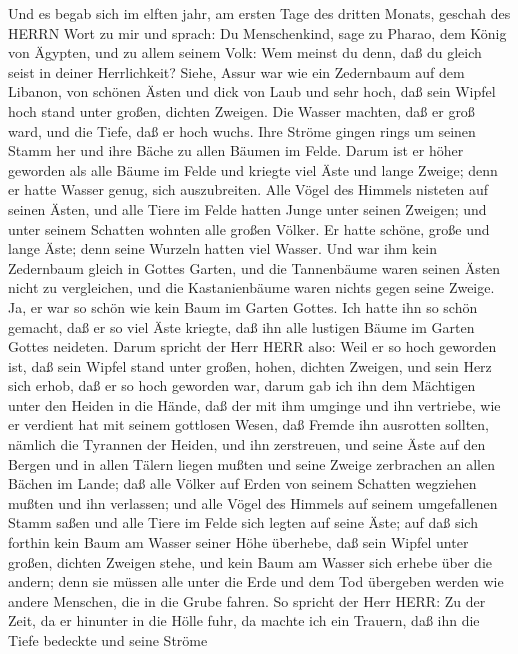  Und es begab sich im elften jahr, am ersten Tage des
dritten Monats, geschah des HERRN Wort zu mir und sprach: 
Du Menschenkind, sage zu Pharao, dem König von Ägypten, und zu allem
seinem Volk: Wem meinst du denn, daß du gleich seist in deiner
Herrlichkeit?  Siehe, Assur war wie ein Zedernbaum auf dem
Libanon, von schönen Ästen und dick von Laub und sehr hoch, daß sein
Wipfel hoch stand unter großen, dichten Zweigen.  Die Wasser
machten, daß er groß ward, und die Tiefe, daß er hoch wuchs. Ihre Ströme
gingen rings um seinen Stamm her und ihre Bäche zu allen Bäumen im
Felde.  Darum ist er höher geworden als alle Bäume im Felde
und kriegte viel Äste und lange Zweige; denn er hatte Wasser genug, sich
auszubreiten.  Alle Vögel des Himmels nisteten auf seinen
Ästen, und alle Tiere im Felde hatten Junge unter seinen Zweigen; und
unter seinem Schatten wohnten alle großen Völker.  Er hatte
schöne, große und lange Äste; denn seine Wurzeln hatten viel Wasser.
 Und war ihm kein Zedernbaum gleich in Gottes Garten, und
die Tannenbäume waren seinen Ästen nicht zu vergleichen, und die
Kastanienbäume waren nichts gegen seine Zweige. Ja, er war so schön wie
kein Baum im Garten Gottes.  Ich hatte ihn so schön gemacht,
daß er so viel Äste kriegte, daß ihn alle lustigen Bäume im Garten
Gottes neideten.  Darum spricht der Herr HERR also: Weil er
so hoch geworden ist, daß sein Wipfel stand unter großen, hohen, dichten
Zweigen, und sein Herz sich erhob, daß er so hoch geworden war,
 darum gab ich ihn dem Mächtigen unter den Heiden in die
Hände, daß der mit ihm umginge und ihn vertriebe, wie er verdient hat
mit seinem gottlosen Wesen,  daß Fremde ihn ausrotten
sollten, nämlich die Tyrannen der Heiden, und ihn zerstreuen, und seine
Äste auf den Bergen und in allen Tälern liegen mußten und seine Zweige
zerbrachen an allen Bächen im Lande; daß alle Völker auf Erden von
seinem Schatten wegziehen mußten und ihn verlassen;  und
alle Vögel des Himmels auf seinem umgefallenen Stamm saßen und alle
Tiere im Felde sich legten auf seine Äste;  auf daß sich
forthin kein Baum am Wasser seiner Höhe überhebe, daß sein Wipfel unter
großen, dichten Zweigen stehe, und kein Baum am Wasser sich erhebe über
die andern; denn sie müssen alle unter die Erde und dem Tod übergeben
werden wie andere Menschen, die in die Grube fahren.  So
spricht der Herr HERR: Zu der Zeit, da er hinunter in die Hölle fuhr, da
machte ich ein Trauern, daß ihn die Tiefe bedeckte und seine Ströme
